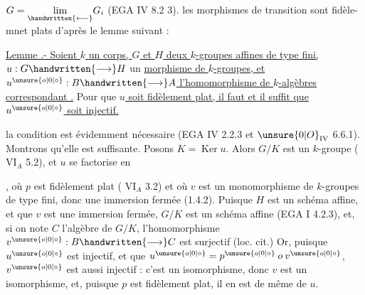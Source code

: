 
$G=\underset{\handwritten{\longleftarrow}}{\lim}G_i$ (EGA IV 8.2 3).  les morphismes de transition sont fidèle-\linebreak {}mnet plats d'après le lemme suivant :


\uline{Lemme .- Soient $k$ un corps, $G$ et $H$ deux $k$-groupes affines de type fini, $u:G\handwritten{\longrightarrow}H$} un \uline{morphisme de $k$-groupes, et $u^{\unsure{o|0|\circ}}:B\handwritten{\longrightarrow}A$ l'homomorphisme de $k$-algèbres correspondant .} Pour que \uline{$u$ soit fidèlement plat, il faut et il suffit que $u^{\unsure{o|0|\circ}}$ soit injectif.}

la condition est évidemment nécessaire (EGA IV 2.2.3 et $\unsure{0|O}_{\mathrm{IV}}$ 6.6.1). Montrons qu'elle est suffisante. Posons $K=\operatorname{Ker}u$. Alors $G/K$ est un $k$-groupe ( $\mathrm{VI}_A$ 5.2), et $u$ se factorise en , où $p$ est fidèlement plat ( $\mathrm{VI}_A$ 3.2) et où $v$ est un monomorphisme de $k$-groupes de type fini, donc une immersion fermée (1.4.2). Puisque $H$ est un schéma affine, et que $v$ est une immersion fermée, $G/K$ est un schéma affine (EGA I 4.2.3), et, si on note $C$ l'algèbre de $G/K$, l'homomorphisme $v^{\unsure{o|0|\circ}}:B\handwritten{\longrightarrow}C$ est surjectif (loc. cit.) Or, puisque $u^{\unsure{o|0|\circ}}$ est injectif, et que $u^{\unsure{o|0|\circ}}=p^{\unsure{o|0|\circ}}\mathbin{o}v^{\unsure{o|0|\circ}}$, $v^{\unsure{o|0|\circ}}$ est aussi injectif : c'est un isomorphisme, donc $v$ est un isomorphisme, et, puisque $p$ est fidèlement plat, il en est de même de $u$.


